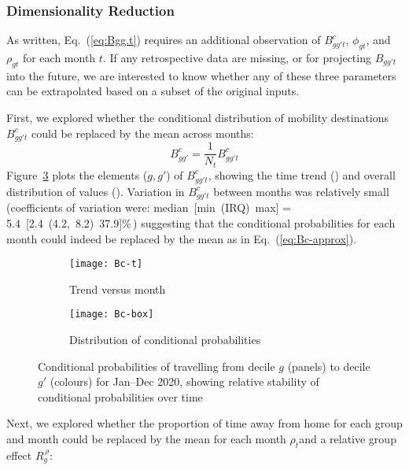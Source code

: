 \subsubsection{Dimensionality Reduction}\label{app.mob.reduce}
As written, Eq.~(\ref{eq:Bgg.t}) requires an additional observation of
$B^c_{gg't}$, $\phi_{gt}$, and $\rho_{gt}$ for each month $t$.
If any retrospective data are missing,
or for projecting $B_{gg't}$ into the future,
we are interested to know whether any of these three parameters
can be extrapolated based on a subset of the original inputs.
\par
First, we explored whether
the conditional distribution of mobility destinations $B^c_{gg't}$
could be replaced by the mean across months:
\begin{equation}\label{eq:Bc-approx}
  B^c_{gg'} = \frac{1}{N_t} B^c_{gg't}
\end{equation}
Figure~\ref{fig:Bc} plots the elements ($g,g'$) of $B^c_{gg't}$,
showing the time trend ()
and overall distribution of values ().
Variation in $B^c_{gg't}$ between months was relatively small
(coefficients of variation were:
median~[min~(IRQ)~max] = 5.4~[2.4~(4.2,~8.2)~37.9]\%\,)
suggesting that the conditional probabilities for each month
could indeed be replaced by the mean as in Eq.~(\ref{eq:Bc-approx}).
\begin{figure}[ht]
  \begin{subfigure}{\linewidth}
    \texttt{[image: Bc-t]}
    \caption{Trend versus month}
    \label{fig:Bc-t}
  \end{subfigure}
  \begin{subfigure}{\linewidth}
    \texttt{[image: Bc-box]}
    \caption{Distribution of conditional probabilities}
    \label{fig:Bc-box}
  \end{subfigure}
  \caption{Conditional probabilities of
    travelling from decile $g$ (panels) to decile $g'$ (colours) for Jan--Dec 2020,
    showing relative stability of conditional probabilities over time}
  \label{fig:Bc}
\end{figure}
\par
Next, we explored whether the proportion of time away from home
for each group and month could be replaced by
the mean for each month $\rho_{t}$and a relative group effect $R^{\,\rho}_{g}$:
